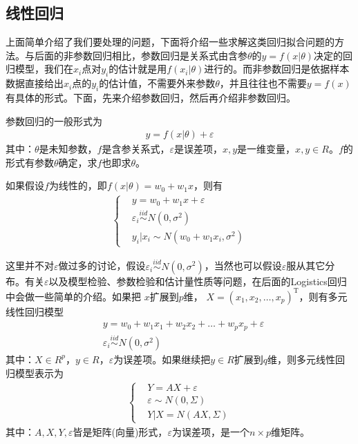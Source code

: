     \subsection{线性回归}
        \par
        上面简单介绍了我们要处理的问题，下面将介绍一些求解这类回归拟合问题的方法。与后面的非参数回归相比，参数回归是关系式由含参$\theta$的$y = f(x|\theta)$决定的回归模型，我们在$x_i$点对$y_i$的估计就是用$f(x_i|\theta)$进行的。而非参数回归是依据样本数据直接给出$x_i$点的$y_i$的估计值，不需要外来参数$\theta$，并且往往也不需要$y = f(x)$有具体的形式。下面，先来介绍参数回归，然后再介绍非参数回归。
        \par
        参数回归的一般形式为
        \begin{align*}
        y = f(x|\theta) + \varepsilon
        \end{align*}
        其中：$\theta$是未知参数，$f$是含参关系式，$\varepsilon$是误差项，$x,y$是一维变量，$x,y\in R$。$f$的形式有参数$\theta$确定，求$f$也即求$\theta$。
        \par
        如果假设$f$为线性的，即$f(x|\theta) = w_0+w_1 x$，则有
        \begin{align*}
        \left\{
        \begin{aligned}
        &y=w_0+w_1 x+\varepsilon\\
        &\varepsilon_i \overset{iid}{\sim} N(0,\sigma^2) \\
        &y_i|x_i \sim N(w_0+w_1 x_i,\sigma^2)
        \end{aligned}
        \right.
        \end{align*}
        \par
        这里并不对$\varepsilon$做过多的讨论，假设$\varepsilon_i \overset{iid}{\sim} N(0,\sigma^2) $，当然也可以假设$\varepsilon$服从其它分布。有关$\varepsilon$以及模型检验、参数检验和估计量性质等问题，在后面的Logistics回归中会做一些简单的介绍。如果把 $x$扩展到$p$维， $X = (x_1,x_2,\dots,x_p)^{\mathrm{T}}$，则有多元线性回归模型
        \begin{align*}
        &y = w_0+w_1x_1+w_2x_2+\dots+w_px_p +\varepsilon\\
        &\varepsilon_i \overset{iid}{\sim} N(0,\sigma^2)
        \end{align*}
        其中：$X\in R^p$，$y\in R$，$\varepsilon$为误差项。如果继续把$y\in R$扩展到$q$维，则多元线性回归模型表示为
        \begin{align*}
        \left\{
          \begin{aligned}
          &Y = A X + \varepsilon \\
          &\varepsilon \sim N(0,\Sigma)\\
          &Y |X = N(AX,\Sigma)
          \end{aligned}
        \right.
        \end{align*}
        其中：$A,X,Y,\varepsilon$皆是矩阵(向量)形式，$\varepsilon$为误差项，是一个$n\times p$维矩阵。
